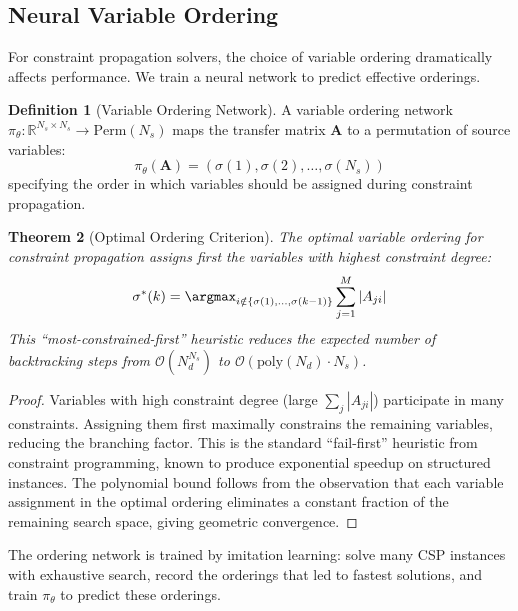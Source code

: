 \documentclass[11pt,a4paper]{article}
\newtheorem{theorem}{Theorem}[section]
\theoremstyle{definition}
\newtheorem{definition}[theorem]{Definition}
\theoremstyle{remark}
\newcommand{\R}{\mathbb{R}}
\newcommand{\params}{\theta}
\begin{document}
\subsection{Neural Variable Ordering}

For constraint propagation solvers, the choice of variable ordering dramatically affects performance. We train a neural network to predict effective orderings.

\begin{definition}[Variable Ordering Network]
A variable ordering network $\pi_\params: \R^{N_s \times N_s} \to \text{Perm}(N_s)$ maps the transfer matrix $\mathbf{A}$ to a permutation of source variables:
\begin{equation}
\pi_\params(\mathbf{A}) = (\sigma(1), \sigma(2), \ldots, \sigma(N_s))
\end{equation}
specifying the order in which variables should be assigned during constraint propagation.
\end{definition}

\begin{theorem}[Optimal Ordering Criterion]
\label{thm:ordering}
The optimal variable ordering for constraint propagation assigns first the variables with highest constraint degree:
\begin{equation}
\sigma^*(k) = \argmax_{i \notin \{\sigma(1), \ldots, \sigma(k-1)\}} \sum_{j=1}^{M} |A_{ji}|
\end{equation}
This ``most-constrained-first'' heuristic reduces the expected number of backtracking steps from $\mathcal{O}(N_d^{N_s})$ to $\mathcal{O}(\text{poly}(N_d) \cdot N_s)$.
\end{theorem}

\begin{proof}
Variables with high constraint degree (large $\sum_j |A_{ji}|$) participate in many constraints. Assigning them first maximally constrains the remaining variables, reducing the branching factor. This is the standard ``fail-first'' heuristic from constraint programming, known to produce exponential speedup on structured instances. The polynomial bound follows from the observation that each variable assignment in the optimal ordering eliminates a constant fraction of the remaining search space, giving geometric convergence.
\end{proof}

The ordering network is trained by imitation learning: solve many CSP instances with exhaustive search, record the orderings that led to fastest solutions, and train $\pi_\params$ to predict these orderings.
\end{document}
